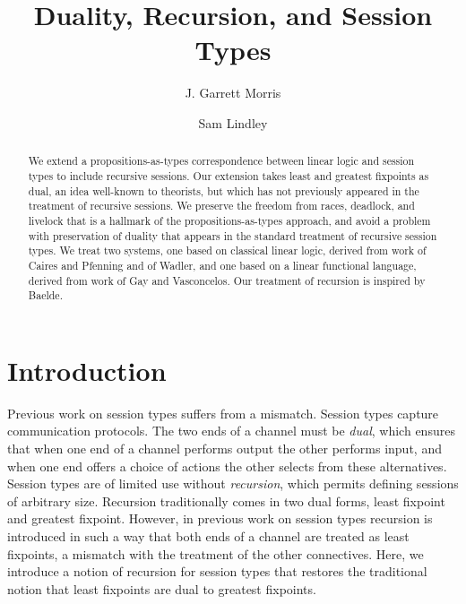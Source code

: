 \documentclass[orivec,envcountsame]{llncs}
\title{Duality, Recursion, and Session Types}
\author{J. Garrett Morris \and Sam Lindley}
\institute{University of Edinburgh \\
           \email{\{Garrett.Morris,Sam.Lindley\}@ed.ac.uk}}
\begin{document}
\maketitle

\begin{abstract}
  We extend a propositions-as-types correspondence between linear logic and session types to include
  recursive sessions.  Our extension takes least and greatest fixpoints as dual, an idea well-known
  to theorists, but which has not previously appeared in the treatment of recursive sessions. We
  preserve the freedom from races, deadlock, and livelock that is a hallmark of the
  propositions-as-types approach, and avoid a problem with preservation of duality that appears in
  the standard treatment of recursive session types. We treat two systems, one based on classical
  linear logic, derived from work of Caires and Pfenning and of Wadler, and one based on a linear
  functional language, derived from work of Gay and Vasconcelos. Our treatment of recursion is
  inspired by Baelde.
\end{abstract}

\section{Introduction}\label{sec:intro}

Previous work on session types suffers from a mismatch.  Session types capture communication
protocols. The two ends of a channel must be \emph{dual}, which ensures that when one end of a
channel performs output the other performs input, and when one end offers a choice of actions the
other selects from these alternatives. Session types are of limited use without \emph{recursion},
which permits defining sessions of arbitrary size. Recursion traditionally comes in two dual forms,
least fixpoint and greatest fixpoint. However, in previous work on session types recursion is
introduced in such a way that both ends of a channel are treated as least fixpoints, a mismatch with
the treatment of the other connectives. Here, we introduce a notion of recursion for session types
that restores the traditional notion that least fixpoints are dual to greatest fixpoints.
\end{document}
